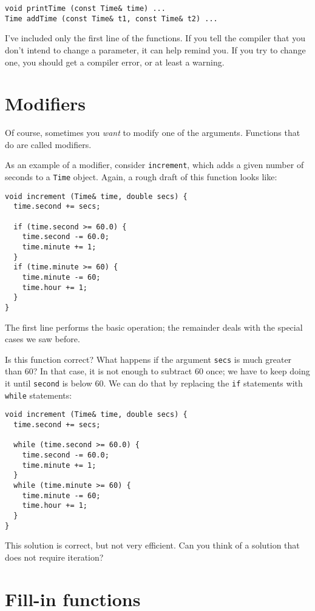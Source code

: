 \begin{verbatim}
void printTime (const Time& time) ...
Time addTime (const Time& t1, const Time& t2) ...
\end{verbatim}
%
I've included only the first line of the functions.  If you tell
the compiler that you don't intend to change a
parameter, it can help remind you.  If you try to change one,
you should get a compiler error, or at least a warning.


\section{Modifiers}

Of course, sometimes you {\em want} to modify one of the
arguments.  Functions that do are called modifiers.

As an example of a modifier, consider {\tt increment},
which adds a given number of seconds to a {\tt Time} object.
Again, a rough draft of this function looks like:

\begin{verbatim}
void increment (Time& time, double secs) {
  time.second += secs;

  if (time.second >= 60.0) {
    time.second -= 60.0;
    time.minute += 1;
  }
  if (time.minute >= 60) {
    time.minute -= 60;
    time.hour += 1;
  }
}
\end{verbatim}
%
The first line performs the basic operation; the remainder
deals with the special cases we saw before.

Is this function correct?  What happens if the argument {\tt secs}
is much greater than 60?  In that case, it is not enough to
subtract 60 once; we have to keep doing it until {\tt second}
is below 60.  We can do that by replacing the {\tt if}
statements with {\tt while} statements:

\begin{verbatim}
void increment (Time& time, double secs) {
  time.second += secs;

  while (time.second >= 60.0) {
    time.second -= 60.0;
    time.minute += 1;
  }
  while (time.minute >= 60) {
    time.minute -= 60;
    time.hour += 1;
  }
}
\end{verbatim}
%
This solution is correct, but not very efficient.
Can you think of a solution that does not require iteration?

\section{Fill-in functions}


